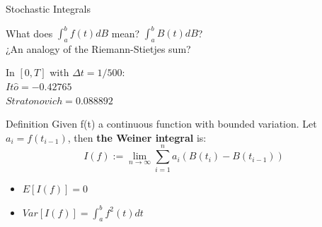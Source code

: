 \begin{frame}{Stochastic Integrals}
\pause
\begin{center}
What does $\int_{a}^{b} f(t)dB$ mean? \bigskip \pause  $\int_{a}^{b} B(t)dB$?\pause \\

¿An analogy of the Riemann-Stietjes sum?\\ \pause 
\bigskip

In $[0,T]$ with $\Delta t=1/500$:\\ \pause
$It\hat{o}=-0.42765$\\ \pause
$Stratonovich=0.088892$
\end{center}
\end{frame}




\begin{frame}
\begin{block}{Definition}
Given f(t) a continuous function with bounded variation. Let $a_i=f(t_{i-1})$, then \textbf{the Weiner integral} is:
\begin{equation*}
I(f):=\lim_{n \to \infty}\sum_{i=1}^{n}a_i(B(t_i)-B(t_{i-1}))
\end{equation*}
\pause
\begin{itemize}
\item $E[I(f)]=0$
\item $Var[I(f)]=\int_{a}^{b}f^2(t)dt$
\end{itemize}
\end{block}

\end{frame}
